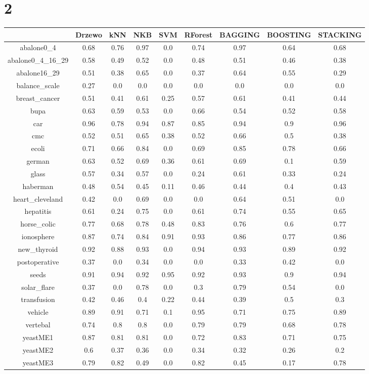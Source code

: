 \documentclass{article}%
\begin{document}
%
\section*{2}%
\begin{tabular}{|c|c|c|c|c|c|c|c|c|}%
\hline%
&Drzewo&kNN&NKB&SVM&RForest&BAGGING&BOOSTING&STACKING\\%
\hline%
abalone0\_4&0.68&0.76&0.97&0.0&0.74&0.97&0.64&0.68\\%
\hline%
abalone0\_4\_16\_29&0.58&0.49&0.52&0.0&0.48&0.51&0.46&0.38\\%
\hline%
abalone16\_29&0.51&0.38&0.65&0.0&0.37&0.64&0.55&0.29\\%
\hline%
balance\_scale&0.27&0.0&0.0&0.0&0.0&0.0&0.0&0.0\\%
\hline%
breast\_cancer&0.51&0.41&0.61&0.25&0.57&0.61&0.41&0.44\\%
\hline%
bupa&0.63&0.59&0.53&0.0&0.66&0.54&0.52&0.58\\%
\hline%
car&0.96&0.78&0.94&0.87&0.85&0.94&0.9&0.96\\%
\hline%
cmc&0.52&0.51&0.65&0.38&0.52&0.66&0.5&0.38\\%
\hline%
ecoli&0.71&0.66&0.84&0.0&0.69&0.85&0.78&0.66\\%
\hline%
german&0.63&0.52&0.69&0.36&0.61&0.69&0.1&0.59\\%
\hline%
glass&0.57&0.34&0.57&0.0&0.24&0.61&0.33&0.24\\%
\hline%
haberman&0.48&0.54&0.45&0.11&0.46&0.44&0.4&0.43\\%
\hline%
heart\_cleveland&0.42&0.0&0.69&0.0&0.0&0.64&0.51&0.0\\%
\hline%
hepatitis&0.61&0.24&0.75&0.0&0.61&0.74&0.55&0.65\\%
\hline%
horse\_colic&0.77&0.68&0.78&0.48&0.83&0.76&0.6&0.77\\%
\hline%
ionosphere&0.87&0.74&0.84&0.91&0.93&0.86&0.77&0.86\\%
\hline%
new\_thyroid&0.92&0.88&0.93&0.0&0.94&0.93&0.89&0.92\\%
\hline%
postoperative&0.37&0.0&0.34&0.0&0.0&0.33&0.42&0.0\\%
\hline%
seeds&0.91&0.94&0.92&0.95&0.92&0.93&0.9&0.94\\%
\hline%
solar\_flare&0.37&0.0&0.78&0.0&0.3&0.79&0.54&0.0\\%
\hline%
transfusion&0.42&0.46&0.4&0.22&0.44&0.39&0.5&0.3\\%
\hline%
vehicle&0.89&0.91&0.71&0.1&0.95&0.71&0.75&0.89\\%
\hline%
vertebal&0.74&0.8&0.8&0.0&0.79&0.79&0.68&0.78\\%
\hline%
yeastME1&0.87&0.81&0.81&0.0&0.72&0.83&0.71&0.75\\%
\hline%
yeastME2&0.6&0.37&0.36&0.0&0.34&0.32&0.26&0.2\\%
\hline%
yeastME3&0.79&0.82&0.49&0.0&0.82&0.45&0.17&0.78\\%
\hline%
\end{tabular}
\end{document}
